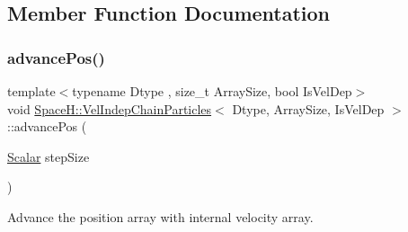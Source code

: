 \subsection{Member Function Documentation}
\mbox{\label{class_space_h_1_1_vel_indep_chain_particles_a647d4861878b28d79b6aab00de12ab8d}} 
\subsubsection{\texorpdfstring{advance\+Pos()}{advancePos()}\hspace{0.1cm}{\footnotesize\ttfamily [1/4]}}
{\footnotesize\ttfamily template$<$typename Dtype , size\+\_\+t Array\+Size, bool Is\+Vel\+Dep$>$ \\
void \mbox{\hyperlink{class_space_h_1_1_vel_indep_chain_particles}{Space\+H\+::\+Vel\+Indep\+Chain\+Particles}}$<$ Dtype, Array\+Size, Is\+Vel\+Dep $>$\+::advance\+Pos (\begin{DoxyParamCaption}\item[{\mbox{\hyperlink{class_space_h_1_1_vel_indep_particles_aeb47d8131b30ed790320ff634f0d6af1}{Scalar}}}]{step\+Size }\end{DoxyParamCaption})\hspace{0.3cm}{\ttfamily [inline]}}



Advance the position array with internal velocity array. 


